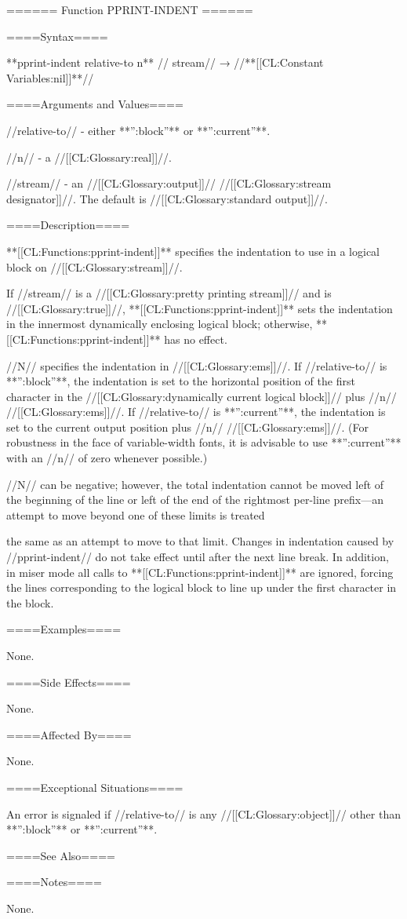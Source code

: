 ====== Function PPRINT-INDENT ======

====Syntax====

**pprint-indent {relative-to n** //\opt} stream// → //**[[CL:Constant Variables:nil]]**//

====Arguments and Values====

//relative-to// - either **'':block''** or **'':current''**.

//n// - a //[[CL:Glossary:real]]//.

//stream// - an //[[CL:Glossary:output]]// //[[CL:Glossary:stream designator]]//. The default is //[[CL:Glossary:standard output]]//.

====Description====

**[[CL:Functions:pprint-indent]]** specifies the indentation to use in a logical block on //[[CL:Glossary:stream]]//.

If //stream// is a //[[CL:Glossary:pretty printing stream]]// and  is //[[CL:Glossary:true]]//, **[[CL:Functions:pprint-indent]]** sets the indentation in the innermost dynamically enclosing logical block; otherwise, **[[CL:Functions:pprint-indent]]** has no effect.

//N// specifies the indentation in //[[CL:Glossary:ems]]//. If //relative-to// is **'':block''**, the indentation is set to the horizontal position of the first character in the //[[CL:Glossary:dynamically current logical block]]// plus //n// //[[CL:Glossary:ems]]//. If //relative-to// is **'':current''**, the indentation is set to the current output position plus //n// //[[CL:Glossary:ems]]//. (For robustness in the face of variable-width fonts, it is advisable to use **'':current''** with an //n// of zero whenever possible.)

//N// can be negative; however, the total indentation cannot be moved left of the beginning of the line or left of the end of the rightmost per-line prefix---an attempt to move beyond one of these limits is treated

the same as an attempt to move to that limit. Changes in indentation caused by //pprint-indent// do not take effect until after the next line break. In addition, in miser mode all calls to **[[CL:Functions:pprint-indent]]** are ignored, forcing the lines corresponding to the logical block to line up under the first character in the block.

====Examples====

None.

====Side Effects====

None.

====Affected By====

None.

====Exceptional Situations====

An error is signaled if //relative-to// is any //[[CL:Glossary:object]]// other than **'':block''** or **'':current''**.

====See Also====

{\secref\TildeI}

====Notes====

None.

 

